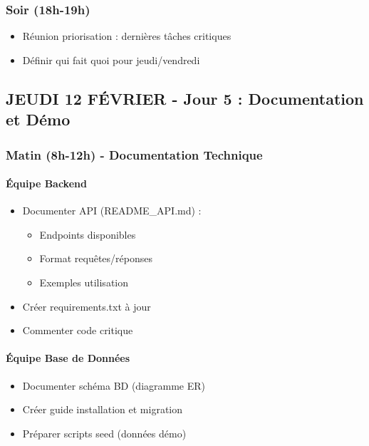 \documentclass[11pt,a4paper]{article}
\begin{document}
\subsubsection{Soir (18h-19h)}
\begin{itemize}
    \item[$\square$] Réunion priorisation : dernières tâches critiques
    \item[$\square$] Définir qui fait quoi pour jeudi/vendredi
\end{itemize}

\clearpage

\subsection{JEUDI 12 FÉVRIER - Jour 5 : Documentation et Démo}

\subsubsection{Matin (8h-12h) - Documentation Technique}

\paragraph{Équipe Backend}
\begin{itemize}
    \item[$\square$] Documenter API (README\_API.md) :
    \begin{itemize}
        \item Endpoints disponibles
        \item Format requêtes/réponses
        \item Exemples utilisation
    \end{itemize}
    \item[$\square$] Créer requirements.txt à jour
    \item[$\square$] Commenter code critique
\end{itemize}

\paragraph{Équipe Base de Données}
\begin{itemize}
    \item[$\square$] Documenter schéma BD (diagramme ER)
    \item[$\square$] Créer guide installation et migration
    \item[$\square$] Préparer scripts seed (données démo)
\end{itemize}
\end{document}

